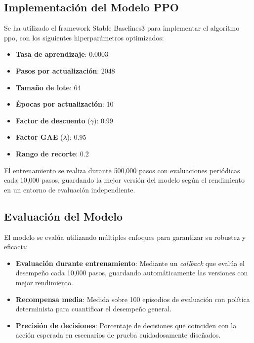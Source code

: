 \subsection{Implementación del Modelo PPO}
\label{implementacion-ppo}

Se ha utilizado el framework Stable Baselines3 para implementar el algoritmo \gls{ppo}, con los siguientes hiperparámetros optimizados:

\begin{itemize}
    \item \textbf{Tasa de aprendizaje}: 0.0003
    \item \textbf{Pasos por actualización}: 2048
    \item \textbf{Tamaño de lote}: 64
    \item \textbf{Épocas por actualización}: 10
    \item \textbf{Factor de descuento} ($\gamma$): 0.99
    \item \textbf{Factor GAE} ($\lambda$): 0.95
    \item \textbf{Rango de recorte}: 0.2
\end{itemize}

El entrenamiento se realiza durante 500,000 pasos con evaluaciones periódicas cada 10,000 pasos, guardando la mejor versión del modelo según el rendimiento en un entorno de evaluación independiente.

\subsection{Evaluación del Modelo}
\label{evaluacion-modelo-ppo}

El modelo se evalúa utilizando múltiples enfoques para garantizar su robustez y eficacia:

\begin{itemize}
  \item \textbf{Evaluación durante entrenamiento}: Mediante un \textit{callback} que evalúa el desempeño cada 10,000 pasos, guardando automáticamente las versiones con mejor rendimiento.
  
  \item \textbf{Recompensa media}: Medida sobre 100 episodios de evaluación con política determinista para cuantificar el desempeño general.
  
  \item \textbf{Precisión de decisiones}: Porcentaje de decisiones que coinciden con la acción esperada en escenarios de prueba cuidadosamente diseñados.
\end{itemize}

